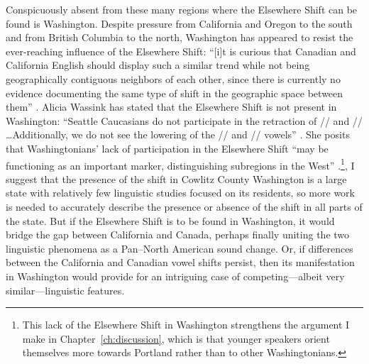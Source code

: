 Conspicuously absent from these many regions where the Elsewhere Shift can be found is Washington. Despite pressure from California and Oregon to the south and from British Columbia to the north, Washington has appeared to resist the ever-reaching influence of the Elsewhere Shift: ``[i]t is curious that Canadian and California English should display such a similar trend while not being geographically contiguous neighbors of each other, since there is currently no evidence documenting the same type of shift in the geographic space between them'' \citep[30--31]{swan_2016_diss}. Alicia Wassink has stated that the Elsewhere Shift is not present in Washington: ``Seattle Caucasians do not participate in the retraction of /\textipa{\ae}/ \bat and // \bet\ldots Additionally, we do not see the lowering of the // \bit and // \bet vowels'' \citeyearpar[84]{wassink_2016_pads}. She posits that Washingtonians' lack of participation in the Elsewhere Shift ``may be functioning as an important marker, distinguishing subregions in the West'' \citep[53]{wassink_2015}.\footnote{This lack of the Elsewhere Shift in Washington strengthens the argument I make in Chapter~\ref{ch:discussion}, which is that younger speakers orient themselves more towards Portland rather than to other Washingtonians.}, I suggest that the presence of the shift in Cowlitz County Washington is a large state with relatively few linguistic studies focused on its residents, so more work is needed to accurately describe the presence or absence of the shift in all parts of the state. But if the Elsewhere Shift is to be found in Washington, it would bridge the gap between California and Canada, perhaps finally uniting the two linguistic phenomena as a Pan--North American sound change. Or, if differences between the California and Canadian vowel shifts persist, then its manifestation in Washington would provide for an intriguing case of competing---albeit very similar---linguistic features.

